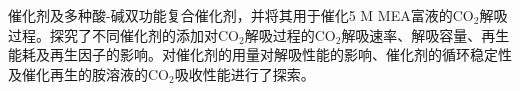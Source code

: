 \begin{summary}
催化剂及多种酸-碱双功能复合催化剂，并将其用于催化5 M MEA富液的$\text{CO}_2$解吸过程。探究了不同催化剂的添加对$\text{CO}_2$解吸过程的$\text{CO}_2$解吸速率、解吸容量、再生能耗及再生因子的影响。对催化剂的用量对解吸性能的影响、催化剂的循环稳定性及催化再生的胺溶液的$\text{CO}_2$吸收性能进行了探索。
\end{summary}
